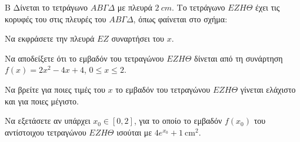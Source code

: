 \begin{thema}{Β}
Δίνεται το τετράγωνο $ΑΒΓΔ$ με πλευρά $2\ \si{cm}$. Το τετράγωνο $ΕΖΗΘ$ έχει τις κορυφές του στις πλευρές του $ΑΒΓΔ$, όπως φαίνεται στο σχήμα:
\begin{center}
\end{center}
\vspace{4pt}

\begin{erwthma}
    \item Να εκφράσετε την πλευρά $EZ$ συναρτήσει του $x$. 
    \item Να αποδείξετε ότι το εμβαδόν του τετραγώνου $ΕΖΗΘ$ δίνεται από τη συνάρτηση $f(x) = 2x^2 - 4x + 4$, $0 \leq x \leq 2$. 
    \item Να βρείτε για ποιες τιμές του $x$ το εμβαδόν του τετραγώνου $ΕΖΗΘ$ γίνεται ελάχιστο και για ποιες μέγιστο. 
    \item Να εξετάσετε αν υπάρχει $x_0 \in [0, 2]$, για το οποίο το εμβαδόν $f(x_0)$ του αντίστοιχου τετραγώνου $ΕΖΗΘ$ ισούται με $4e^{x_0} + 1\ \text{cm}^2$. 
\end{erwthma}
\end{thema}
